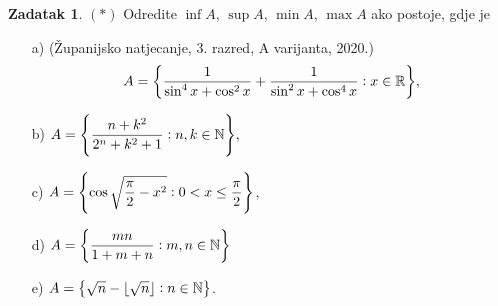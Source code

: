 \documentclass{book}
\let\originalleft\left
\let\originalright\right
\renewcommand{\left}{\mathopen{}\mathclose\bgroup\originalleft}
\renewcommand{\right}{\aftergroup\egroup\originalright}
\theoremstyle{definition}
\theoremstyle{definition}
\newtheorem{exercise}{Zadatak}
\theoremstyle{remark}
\begin{document}
\begin{exercise} $(*)$
Odredite $\inf{A}$, $\sup{A}$, $\min{A}$, $\max{A}$ ako postoje, gdje je
\begin{itemize}
\item[a)] (Županijsko natjecanje, 3. razred, A varijanta, 2020.) $$A=\left\{\dfrac{1}{\sin^4{x}+\cos^2{x}}+\dfrac{1}{\sin^2{x}+\cos^4{x}} : x\in \mathbb{R}\right\},$$
\item[b)]
$A=\left\{\dfrac{n+k^2}{2^n+k^2+1} : n, k\in \mathbb{N}\right\},$
\item[c)] $A=\left\{\cos{\sqrt{\dfrac{\pi}{2}-x^2}} : 0<x\leq \dfrac{\pi}{2}\right\}$,
\item[d)] $A=\left\{\dfrac{mn}{1+m+n} : m, n\in \mathbb{N}\right\}$
\item[e)] $A=\left\{\sqrt{n}-\lfloor \sqrt{n}\rfloor : n\in \mathbb{N}\right\}$.
\end{itemize}

\end{exercise}
\end{document}
